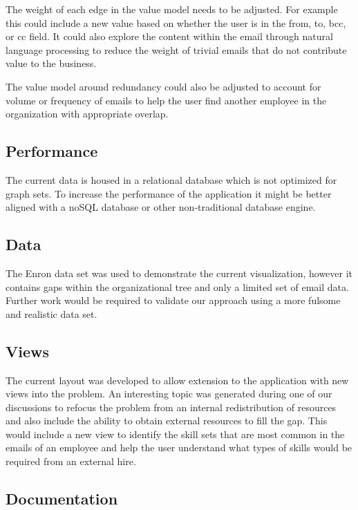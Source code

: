 \documentclass[journal]{vgtc}                %
\begin{document}
The weight of each edge in the value model needs to be adjusted.  For example this could include a new value based on whether the user is in the from, to, bcc, or cc field.  It could also explore the content within the email through natural language processing to reduce the weight of trivial emails that do not contribute value to the business.

The value model around redundancy could also be adjusted to account for volume or frequency of emails to help the user find another employee in the organization with appropriate overlap.

\subsection{Performance}

The current data is housed in a relational database which is not optimized for graph sets.  To increase the performance of the application it might be better aligned with a noSQL database or other non-traditional database engine.

\subsection{Data}

The Enron data set was used to demonstrate the current visualization, however it contains gaps within the organizational tree and only a limited set of email data.  Further work would be required to validate our approach using a more fulsome and realistic data set.

\subsection{Views}

The current layout was developed to allow extension to the application with new views into the problem.  An interesting topic was generated during one of our discussions to refocus the problem from an internal redistribution of resources and also include the ability to obtain external resources to fill the gap.  This would include a new view to identify the skill sets that are most common in the emails of an employee and help the user understand what types of skills would be required from an external hire.

\subsection{Documentation}
\end{document}
